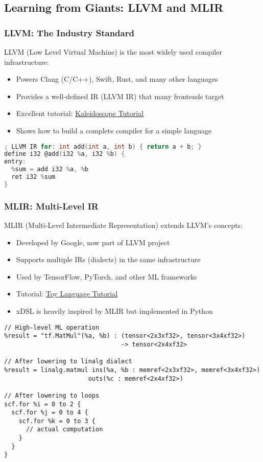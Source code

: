 \documentclass[11pt,a4paper]{article}
\begin{document}
\subsection{Learning from Giants: LLVM and MLIR}

\subsubsection{LLVM: The Industry Standard}

LLVM (Low Level Virtual Machine) is the most widely used compiler infrastructure:
\begin{itemize}
    \item Powers Clang (C/C++), Swift, Rust, and many other languages
    \item Provides a well-defined IR (LLVM IR) that many frontends target
    \item Excellent tutorial: \href{https://llvm.org/docs/tutorial/MyFirstLanguageFrontend/index.html}{Kaleidoscope Tutorial}
    \item Shows how to build a complete compiler for a simple language
\end{itemize}

\begin{lstlisting}[language=C, caption=LLVM IR Example]
; LLVM IR for: int add(int a, int b) { return a + b; }
define i32 @add(i32 %a, i32 %b) {
entry:
  %sum = add i32 %a, %b
  ret i32 %sum
}
\end{lstlisting}

\subsubsection{MLIR: Multi-Level IR}

MLIR (Multi-Level Intermediate Representation) extends LLVM's concepts:
\begin{itemize}
    \item Developed by Google, now part of LLVM project
    \item Supports multiple IRs (dialects) in the same infrastructure
    \item Used by TensorFlow, PyTorch, and other ML frameworks
    \item Tutorial: \href{https://mlir.llvm.org/docs/Tutorials/Toy/}{Toy Language Tutorial}
    \item xDSL is heavily inspired by MLIR but implemented in Python
\end{itemize}

\begin{lstlisting}[caption=MLIR Example - Multiple Abstraction Levels]
// High-level ML operation
%result = "tf.MatMul"(%a, %b) : (tensor<2x3xf32>, tensor<3x4xf32>) 
                                -> tensor<2x4xf32>

// After lowering to linalg dialect
%result = linalg.matmul ins(%a, %b : memref<2x3xf32>, memref<3x4xf32>)
                       outs(%c : memref<2x4xf32>)

// After lowering to loops
scf.for %i = 0 to 2 {
  scf.for %j = 0 to 4 {
    scf.for %k = 0 to 3 {
      // actual computation
    }
  }
}
\end{lstlisting}
\end{document}
